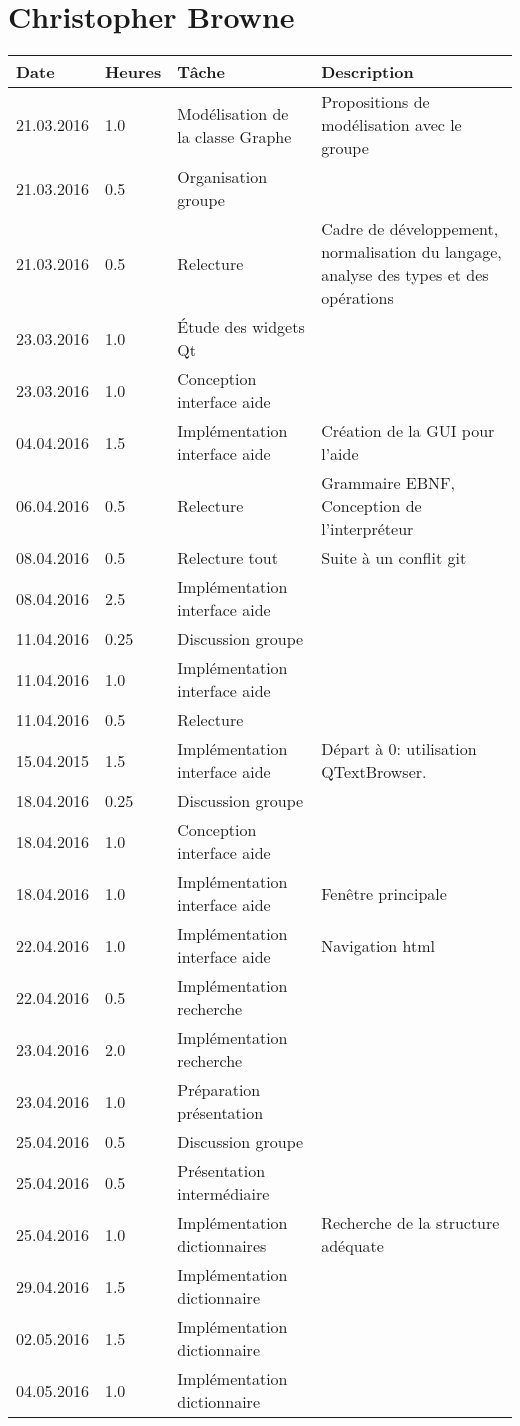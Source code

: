 \documentclass[french]{article}
\begin{document}
	\section*{Christopher Browne}
	\begin{tabular}{p{}|p{}|p{}|p{}}
		Date&Heures&Tâche&Description\\
		\hline \hline
		21.03.2016 & 1.0 & Modélisation de la classe Graphe & Propositions de modélisation avec le groupe \\
		21.03.2016 & 0.5 & Organisation groupe & \\
		21.03.2016 & 0.5 & Relecture & Cadre de développement, normalisation du langage, analyse des types et des opérations \\
		23.03.2016 & 1.0 & Étude des widgets Qt & \\
		23.03.2016 & 1.0 & Conception interface aide\\
		\hline
		04.04.2016 & 1.5 & Implémentation interface aide & Création de la GUI pour l'aide \\
		06.04.2016 & 0.5 & Relecture & Grammaire EBNF, Conception de l'interpréteur\\
		08.04.2016 & 0.5 & Relecture tout & Suite à un conflit git\\
		08.04.2016 & 2.5 & Implémentation interface aide & \\
		\hline
		11.04.2016 & 0.25 & Discussion groupe & \\
		11.04.2016 & 1.0 & Implémentation interface aide & \\
		11.04.2016 & 0.5 & Relecture & \\
		15.04.2015 & 1.5 & Implémentation interface aide & Départ à 0: utilisation QTextBrowser.\\
		\hline
		18.04.2016 & 0.25 & Discussion groupe & \\
		18.04.2016 & 1.0 & Conception interface aide & \\
		18.04.2016 & 1.0 & Implémentation interface aide & Fenêtre principale\\
		22.04.2016 & 1.0 & Implémentation interface aide & Navigation html\\
		22.04.2016 & 0.5 & Implémentation recherche & \\
		23.04.2016 & 2.0 & Implémentation recherche & \\
		23.04.2016 & 1.0 & Préparation présentation & \\
		\hline
		25.04.2016 & 0.5 & Discussion groupe & \\
		25.04.2016 & 0.5 & Présentation intermédiaire & \\
		25.04.2016 & 1.0 & Implémentation dictionnaires & Recherche de la structure adéquate\\
		29.04.2016 & 1.5 & Implémentation dictionnaire & \\
		\hline
		02.05.2016 & 1.5 & Implémentation dictionnaire & \\
		04.05.2016 & 1.0 & Implémentation dictionnaire & \\
	\end{tabular}
	
\end{document}

